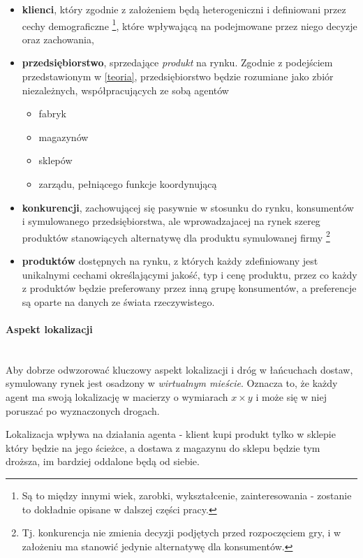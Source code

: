 \documentclass[polish, twoside, 12pt, a4paper]{article}
\theoremstyle{definition}
\theoremstyle{plain}
\theoremstyle{remark}
\begin{document}
\begin{itemize} 
	\item \textbf{klienci}, który zgodnie z założeniem będą heterogeniczni i definiowani przez cechy demograficzne \footnote{Są to między innymi wiek, zarobki, wykształcenie, zainteresowania - zostanie to dokładnie opisane w dalszej części pracy.}, które wpływającą na podejmowane przez niego decyzje oraz zachowania, 
	\item \textbf{przedsiębiorstwo}, sprzedające \textit{produkt} na rynku. Zgodnie z podejściem przedstawionym w \ref{teoria}, przedsiębiorstwo będzie rozumiane jako zbiór niezależnych, współpracujących ze sobą agentów 
		\begin{itemize}
			\item fabryk
			\item magazynów
			\item sklepów 
			\item zarządu, pełniącego funkcje koordynującą 
		\end{itemize}
	\item \textbf{konkurencji}, zachowującej się pasywnie w stosunku do rynku, konsumentów i symulowanego przedsiębiorstwa, ale wprowadzajacej na rynek szereg produktów stanowiących alternatywę dla produktu symulowanej firmy \footnote{Tj. konkurencja nie zmienia decyzji podjętych przed rozpoczęciem gry, i w założeniu ma stanowić jedynie alternatywę dla konsumentów.} 
	\item \textbf{produktów} dostępnych na rynku, z których każdy zdefiniowany jest unikalnymi cechami określającymi jakość, typ i cenę produktu, przez co każdy z produktów będzie preferowany przez inną grupę konsumentów, a preferencje są oparte na danych ze świata rzeczywistego. 
\end{itemize}

\paragraph{Aspekt lokalizacji}\mbox{}\\

Aby dobrze odwzorować kluczowy aspekt lokalizacji i dróg w łańcuchach dostaw, symulowany rynek jest osadzony w \textit{wirtualnym mieście}. Oznacza to, że każdy agent ma swoją lokalizację w macierzy o wymiarach $x \times y$ i może się w niej poruszać po wyznaczonych drogach.

Lokalizacja wpływa na działania agenta - klient kupi produkt tylko w sklepie który będzie na jego ścieżce, a dostawa z magazynu do sklepu będzie tym droższa, im bardziej oddalone będą od siebie. 
\end{document}
